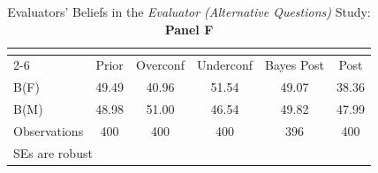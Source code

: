 \begin{table}[htbp]\centering
\caption{Evaluators' Beliefs in the \textit{Evaluator (Alternative Questions)} Study: \textbf{Panel F}}
\begin{tabular}{l*{5}{c}}
\hline\hline
                &\multicolumn{5}{c}{}                             \\\cmidrule(lr){2-6}
                &\multicolumn{1}{c}{Prior}&\multicolumn{1}{c}{Overconf}&\multicolumn{1}{c}{Underconf}&\multicolumn{1}{c}{Bayes Post}&\multicolumn{1}{c}{Post}\\
\hline
B(F)            &    49.49&    40.96&    51.54&    49.07&    38.36\\
B(M)            &    48.98&    51.00&    46.54&    49.82&    47.99\\
\hline
Observations    &      400&      400&      400&      396&      400\\
\hline\hline
\multicolumn{6}{l}{\footnotesize SEs are robust}\\
\end{tabular}
\end{table}
